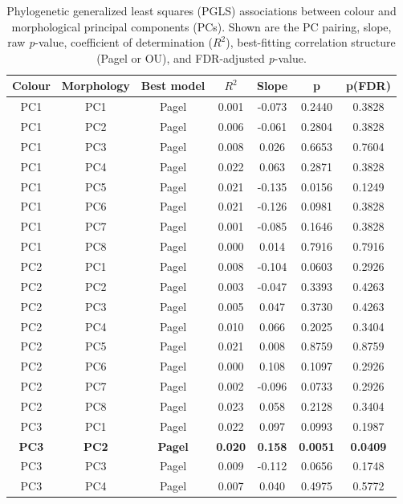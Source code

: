 \begin{table}[!h]
\centering
\caption{\label{tab:tab:color_morph_pgls}Phylogenetic generalized least squares (PGLS) associations between colour and morphological principal components (PCs). Shown are the PC pairing, slope, raw \emph{p}-value, coefficient of determination ($R^2$), best-fitting correlation structure (Pagel or OU), and FDR-adjusted \emph{p}-value.}
\centering
\begin{tabular}[t]{ccccccc}
\toprule
\textbf{Colour} & \textbf{Morphology} & \textbf{Best model} & \textbf{$R^2$} & \textbf{Slope} & \textbf{p} & \textbf{p(FDR)}\\
\midrule
PC1 & PC1 & Pagel & 0.001 & -0.073 & 0.2440 & 0.3828\\
PC1 & PC2 & Pagel & 0.006 & -0.061 & 0.2804 & 0.3828\\
PC1 & PC3 & Pagel & 0.008 & 0.026 & 0.6653 & 0.7604\\
PC1 & PC4 & Pagel & 0.022 & 0.063 & 0.2871 & 0.3828\\
PC1 & PC5 & Pagel & 0.021 & -0.135 & 0.0156 & 0.1249\\
\addlinespace
PC1 & PC6 & Pagel & 0.021 & -0.126 & 0.0981 & 0.3828\\
PC1 & PC7 & Pagel & 0.001 & -0.085 & 0.1646 & 0.3828\\
PC1 & PC8 & Pagel & 0.000 & 0.014 & 0.7916 & 0.7916\\
PC2 & PC1 & Pagel & 0.008 & -0.104 & 0.0603 & 0.2926\\
PC2 & PC2 & Pagel & 0.003 & -0.047 & 0.3393 & 0.4263\\
\addlinespace
PC2 & PC3 & Pagel & 0.005 & 0.047 & 0.3730 & 0.4263\\
PC2 & PC4 & Pagel & 0.010 & 0.066 & 0.2025 & 0.3404\\
PC2 & PC5 & Pagel & 0.021 & 0.008 & 0.8759 & 0.8759\\
PC2 & PC6 & Pagel & 0.000 & 0.108 & 0.1097 & 0.2926\\
PC2 & PC7 & Pagel & 0.002 & -0.096 & 0.0733 & 0.2926\\
\addlinespace
PC2 & PC8 & Pagel & 0.023 & 0.058 & 0.2128 & 0.3404\\
PC3 & PC1 & Pagel & 0.022 & 0.097 & 0.0993 & 0.1987\\
\textbf{PC3} & \textbf{PC2} & \textbf{Pagel} & \textbf{0.020} & \textbf{0.158} & \textbf{0.0051} & \textbf{0.0409}\\
PC3 & PC3 & Pagel & 0.009 & -0.112 & 0.0656 & 0.1748\\
PC3 & PC4 & Pagel & 0.007 & 0.040 & 0.4975 & 0.5772\\

\end{tabular}
\end{table}

